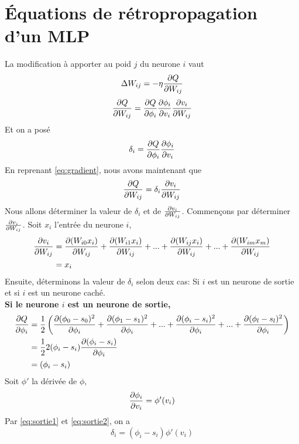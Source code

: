 \section{Équations de rétropropagation d'un MLP}\label{sec:eqmlp}
La modification à apporter au poid $j$ du neurone $i$ vaut
\begin{equation}\label{eq:Delta}
 \Delta W_{ij} = -\eta\frac{\partial Q}{\partial W_{ij}}
\end{equation}
\begin{equation}\label{eq:gradient}
 \frac{\partial Q}{\partial W_{ij}} = \frac{\partial Q}{\partial \phi_i} \frac{\partial \phi_i}{\partial v_i} \frac{\partial v_i}{\partial W_{ij}}
\end{equation}
Et on a posé
\begin{equation}\label{eq:deltai}
 \delta_i = \frac{\partial Q}{\partial \phi_i} \frac{\partial \phi_i}{\partial v_i}
\end{equation}
En reprenant \eqref{eq:gradient}, nous avons maintenant que
\begin{equation}\label{eq:graddelta}
 \frac{\partial Q}{\partial W_{ij}} = \delta_i \frac{\partial v_i}{\partial W_{ij}}
\end{equation}
Nous allons déterminer la valeur de $\delta_i$ et de $\frac{\partial v_i}{\partial W_{ij}}$.
Commençons par déterminer $\frac{\partial v_i}{\partial W_{ij}}$.
Soit $x_i$ l'entrée du neurone $i$,
\begin{equation}\label{eq:gradsum}
 \begin{split}
  \frac{\partial v_i}{\partial W_{ij}} & = \frac{\partial (W_{i0}x_i)}{\partial W_{ij}} + \frac{\partial (W_{i1}x_i)}{\partial W_{ij}} + ... + \frac{\partial (W_{ij}x_i)}{\partial W_{ij}} + ... + \frac{\partial (W_{im}x_m)}{\partial W_{ij}}\\
  ~ & = x_i
  \end{split}
\end{equation}
Ensuite, déterminons la valeur de $\delta_i$ selon deux cas: Si $i$ est un neurone de sortie et si $i$ est un neurone caché.\\

\textbf{Si le neurone $i$ est un neurone de sortie,}
\begin{equation}\label{eq:sortie1}
 \begin{split}
  \frac{\partial Q}{\partial \phi_i} & = \frac{1}{2} \left( \frac{\partial (\phi_0 - s_0)^2}{\partial \phi_i} + \frac{\partial (\phi_1 - s_1)^2}{\partial \phi_i} + ... + \frac{\partial (\phi_i - s_i)^2}{\partial \phi_i} + ... + \frac{\partial (\phi_l - s_l)^2}{\partial \phi_i} \right)\\
  ~ & = \frac{1}{2}2(\phi_i - s_i)\frac{\partial (\phi_i - s_i)}{\partial \phi_i}\\
  ~ & = (\phi_i - s_i)
 \end{split}
\end{equation}
Soit $\phi'$ la dérivée de $\phi$,
\begin{equation}\label{eq:sortie2}
 \frac{\partial \phi_i}{\partial v_i} = \phi'(v_i)
\end{equation}
Par \eqref{eq:sortie1} et \eqref{eq:sortie2}, on a
\[\delta_i = (\phi_i - s_i)\phi'(v_i)\]\\

